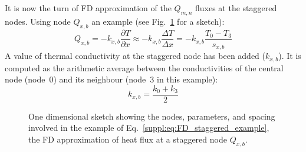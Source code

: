 It is now the turn of FD approximation of the $Q_{m,n}$ fluxes at the staggered nodes.
Using node $Q_{x,b}$ an example (see Fig.~\ref{suppl:fig:stencil_sketch_flux} for a sketch):
\begin{equation}
    \label{suppl:eq:FD_staggered_example}
    Q_{x,b} =
    -k_{x,b} \frac{\partial T}{\partial x} \approx
    -k_{x,b} \frac{\Delta T}{\Delta x} =
    -k_{x,b} \frac{T_0 - T_3}{s_{x,b}}
\end{equation}
A value of thermal conductivity at the staggered node has been added ($k_{x,b}$).
It is computed as the arithmetic average between the conductivities of the central node (node~$0$) and its neighbour (node~$3$ in this example):
\begin{equation}
    \label{suppl:eq:FD_staggered_example_conductivity}
    k_{x,b} = \frac{k_0 + k_3}{2}
\end{equation}

\begin{figure}[hb] %
    \begin{adjustbox}{center}
    \end{adjustbox}
    \caption[Conservative finite differences: sketch for the staggered node example.]{One dimensional sketch showing the nodes, parameters, and spacing involved in the example of Eq.~\ref{suppl:eq:FD_staggered_example}, the FD approximation of heat flux at a staggered node $Q_{x,b}$.}
    \label{suppl:fig:stencil_sketch_flux}
\end{figure}

